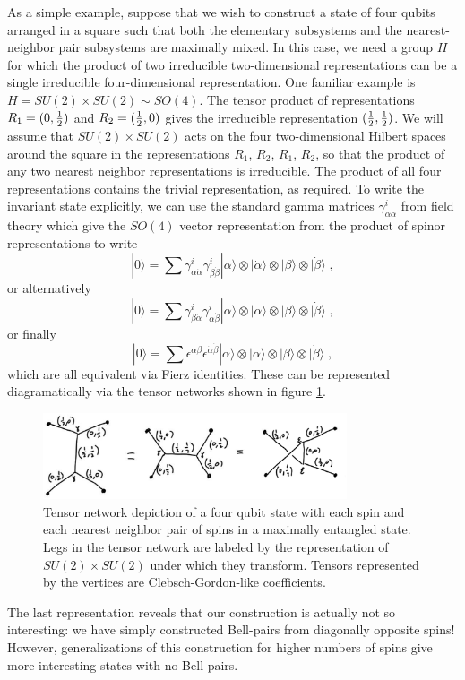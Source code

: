 \documentclass[12pt]{article}
\theoremstyle{definition}
\newcommand{\be}{\begin{equation}}
\newcommand{\ee}{\end{equation}}
\begin{document}
As a simple example, suppose that we wish to construct a state of four qubits arranged in a square such that both the elementary subsystems and the nearest-neighbor pair subsystems are maximally mixed. In this case, we need a group $H$ for which the product of two irreducible two-dimensional representations can be a single irreducible four-dimensional representation. One familiar example is $H = SU(2) \times SU(2) \sim SO(4)$. The tensor product of representations $R_1 = (0, {1 \over 2})$ and  $R_2 = ({1 \over 2}, 0)$ gives the irreducible representation $({1 \over 2}, {1 \over 2})$. We will assume that $SU(2) \times SU(2)$ acts on the four two-dimensional Hilbert spaces around the square in the representations $R_1$, $R_2$, $R_1$, $R_2$, so that the product of any two nearest neighbor representations is irreducible. The product of all four representations contains the trivial representation, as required. To write the invariant state explicitly, we can use the standard gamma matrices $\gamma^i_{\alpha \dot{\alpha}} $ from field theory which give the $SO(4)$ vector representation from the product of spinor representations to write
\be
|0 \rangle = \sum \gamma^i_{\alpha \dot{\alpha}} \gamma^i_{\beta \dot{\beta}} |\alpha \rangle \otimes |\dot{\alpha} \rangle \otimes |\beta \rangle \otimes |\dot{\beta} \rangle \; ,
\ee
or alternatively
\be
|0 \rangle = \sum \gamma^i_{\beta \dot{\alpha}} \gamma^i_{\alpha \dot{\beta}} |\alpha \rangle \otimes |\dot{\alpha} \rangle \otimes |\beta \rangle \otimes |\dot{\beta} \rangle \; ,
\ee
or finally
\be
|0 \rangle = \sum \epsilon^{\alpha \beta} \epsilon^{\dot{\alpha} \dot{\beta}} |\alpha \rangle \otimes |\dot{\alpha} \rangle \otimes |\beta \rangle \otimes |\dot{\beta} \rangle \; ,
\ee
which are all equivalent via Fierz identities. These can be represented diagramatically via the tensor networks shown in figure \ref{group1}.
\begin{figure}
\centering
\includegraphics[width=0.8\textwidth]{group1.eps}
\caption{Tensor network depiction of a four qubit state with each spin and each nearest neighbor pair of spins in a maximally entangled state. Legs in the tensor network are labeled by the representation of $SU(2) \times SU(2)$ under which they transform. Tensors represented by the vertices are Clebsch-Gordon-like coefficients.}
\label{group1}
\end{figure}
The last representation reveals that our construction is actually not so interesting: we have simply constructed Bell-pairs from diagonally opposite spins! However, generalizations of this construction for higher numbers of spins give more interesting states with no Bell pairs.
\end{document}
